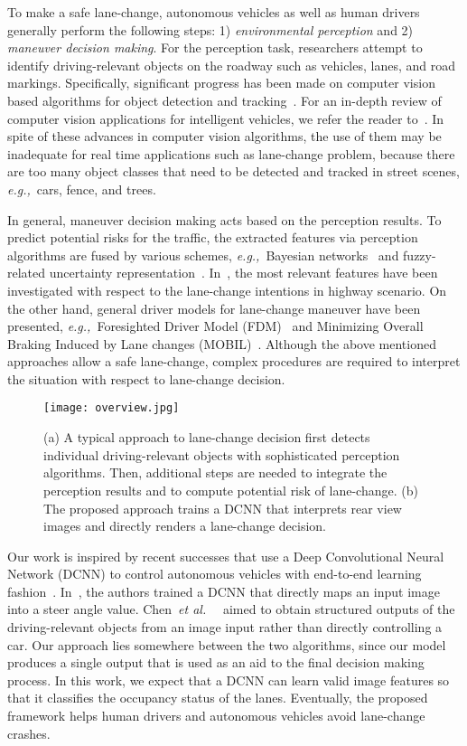 \documentclass[letterpaper, 10pt, conference]{ieeeconf}
\newcommand{\eg}{\textit{e.g.,}~}
\newcommand{\etal}{\textit{et al.}~}
\begin{document}
	To make a safe lane-change, autonomous vehicles as well as human drivers
generally perform the following steps: 1) {\it environmental perception} and
2) {\it maneuver decision making}. For the perception task, researchers attempt
to identify driving-relevant objects on the roadway such as vehicles, lanes, and
road markings. Specifically, significant progress has been made on computer
vision based algorithms for object detection and tracking~\cite{Liu2016,Dai2016,Ren2015,Kalal10}. 
For an in-depth review of computer vision applications for intelligent vehicles, 
we refer the reader to~\cite{Sivaraman2013}. In spite of these advances in computer vision algorithms, the use of them may be inadequate for real time applications such as lane-change problem, because there are too many object classes that need to be detected and tracked in street scenes, \eg cars, fence, and trees.
		
	In general, maneuver decision making acts based on the perception results. To predict potential risks for the traffic, the extracted features via perception
algorithms are fused by various schemes, \eg Bayesian networks~\cite{schubert2010}
and fuzzy-related uncertainty representation~\cite{Pellkofer2002}. 
In~\cite{Schlechtrienmen2014}, the most relevant features have been investigated 
with respect to the lane-change intentions in highway scenario. On the other hand,
general driver models for lane-change maneuver have been presented, \eg Foresighted 
Driver Model (FDM)~\cite{Damerow16} and Minimizing Overall Braking Induced by Lane changes
(MOBIL)~\cite{Kesting99}. Although the above mentioned approaches allow a safe
lane-change, complex procedures are required to interpret the situation with respect to lane-change decision.

	\begin{figure}[t]
		\centering      
		\texttt{[image: overview.jpg]}
		\caption{(a) A typical approach to lane-change decision first detects 
individual driving-relevant objects with sophisticated perception algorithms. 
Then, additional steps are needed to integrate the perception results and 
to compute potential risk of lane-change. (b) The proposed approach trains a DCNN 
that interprets rear view images and directly renders a lane-change decision.
}\label{fig:overview}\vspace{-0.1cm}
	\end{figure}
   

	Our work is inspired by recent successes that use a Deep Convolutional Neural
Network (DCNN) to control autonomous vehicles with end-to-end learning
fashion~\cite{Chen2015,Bojarski2016}. In~\cite{Bojarski2016}, the authors trained
a DCNN that directly maps an input image into a steer angle value. Chen~\etal\cite{Chen2015}~
aimed to obtain structured outputs of the driving-relevant objects from an image input rather than directly controlling a car. Our approach lies somewhere between the two algorithms, since our model produces a single output that is used as an aid to the final decision making process. In this work, we expect that a DCNN can learn valid image features so that it classifies the 
occupancy status of the lanes. Eventually, the proposed framework helps human drivers and autonomous 
vehicles avoid lane-change crashes.
\end{document}
